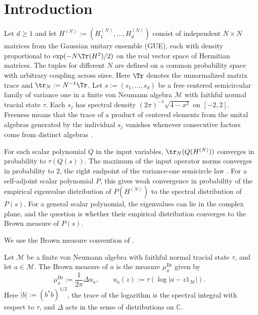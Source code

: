 \section{Introduction}\label{sec:introduction}

Let $d\ge 1$ and let $H^{(N)}:=(H_1^{(N)},\ldots,H_d^{(N)})$ consist of independent $N\times N$ matrices from the Gaussian unitary ensemble (GUE), each with density proportional to $\exp(-N\Tr(H^2)/2)$ on the real vector space of Hermitian matrices.
The tuples for different $N$ are defined on a common probability space with arbitrary coupling across sizes.
Here $\Tr$ denotes the unnormalized matrix trace and $\tr_N:=N^{-1}\Tr$.
Let $s:=(s_1,\ldots,s_d)$ be a free centered semicircular family of variance one in a finite von Neumann algebra $\mathcal M$ with faithful normal tracial state $\tau$.
Each $s_j$ has spectral density $(2\pi)^{-1}\sqrt{4-x^2}$ on $[-2,2]$.
Freeness means that the trace of a product of centered elements from the unital algebras generated by the individual $s_j$ vanishes whenever consecutive factors come from distinct algebras \cite[Definition~2.16, Remark~2.17(2), and Definition~5.3]{NS06}.

For each scalar polynomial $Q$ in the input variables, $\tr_N(Q(H^{(N)}))$ converges in probability to $\tau(Q(s))$.
The maximum of the input operator norms converges in probability to $2$, the right endpoint of the variance-one semicircle law \cite[pp.~1--2 of arXiv v1]{CGP22}.
For a self-adjoint scalar polynomial $P$, this gives weak convergence in probability of the empirical eigenvalue distribution of $P(H^{(N)})$ to the spectral distribution of $P(s)$.
For a general scalar polynomial, the eigenvalues can lie in the complex plane, and the question is whether their empirical distribution converges to the Brown measure of $P(s)$.

We use the Brown measure convention of \cite[Chapter~11, Theorem~5, Definition~6 and pp.~268--270]{MS17}.

\begin{definition}\label{def:brown-measure}
Let $\mathcal M$ be a finite von Neumann algebra with faithful normal tracial state $\tau$, and let $a\in\mathcal M$.
The Brown measure of $a$ is the measure $\mu_a^{\mathrm{Br}}$ given by
\[
 \mu_a^{\mathrm{Br}}:=\frac{1}{2\pi}\Delta u_a,\qquad
 u_a(z):=\tau(\log|a-z1_{\mathcal M}|).
\]
Here $|b|:=(b^*b)^{1/2}$, the trace of the logarithm is the spectral integral with respect to $\tau$, and $\Delta$ acts in the sense of distributions on $\mathbb C$.
\end{definition}

